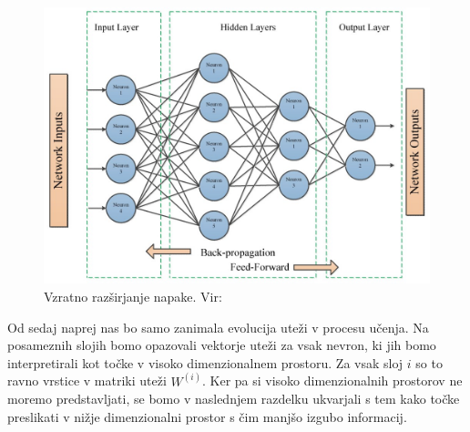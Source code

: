 \begin{figure}[H]
    \centering
    \includegraphics[width=0.7\linewidth]{resources/backpropagation.jpeg}
    \caption{Vzratno razširjanje napake. Vir: \cite{electronics10212689}}
    \label{fig:backprop}
\end{figure}

Od sedaj naprej nas bo samo zanimala evolucija uteži v procesu učenja. Na posameznih slojih bomo opazovali vektorje uteži za vsak nevron, ki jih bomo interpretirali kot točke v visoko dimenzionalnem prostoru. Za vsak sloj $i$ so to  ravno vrstice v matriki uteži $W^{(i)}$. Ker pa si visoko dimenzionalnih prostorov ne moremo predstavljati, se bomo v naslednjem razdelku ukvarjali s tem kako točke preslikati v nižje dimenzionalni prostor s čim manjšo izgubo informacij.
